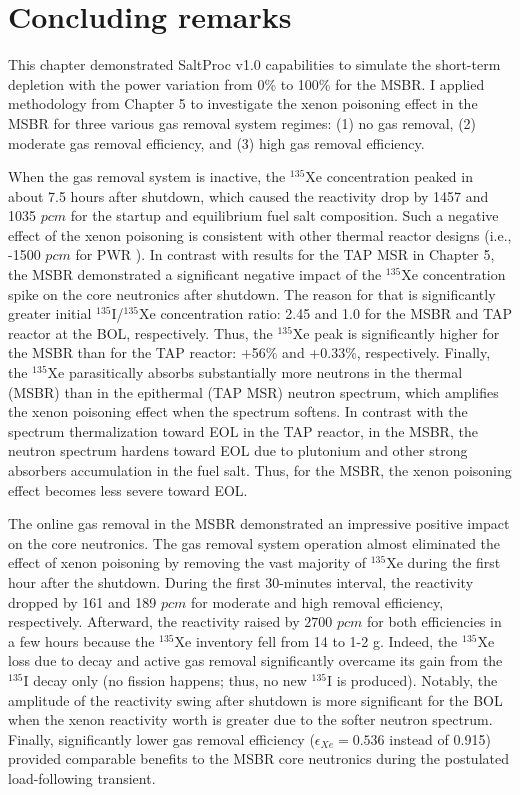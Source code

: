 \section{Concluding remarks}
This chapter demonstrated SaltProc v1.0 capabilities to simulate the 
short-term depletion with the power variation from 0\% to 100\% for the 
\gls{MSBR}. I applied methodology from Chapter 5 to investigate the xenon 
poisoning effect in the \gls{MSBR} for three various gas removal system 
regimes: (1) no gas removal, (2) moderate gas removal efficiency, and (3) high 
gas removal efficiency. 

When the gas removal system is inactive, the $^{135}$Xe concentration peaked 
in about 7.5 hours after shutdown, which caused the reactivity drop by 1457 
and 1035 $pcm$ for the startup and equilibrium fuel salt composition. Such a
negative effect of the xenon poisoning is consistent with other thermal 
reactor designs (i.e., -1500 $pcm$ for \gls{PWR} 
\cite{rykhlevskii_impact_2019}). In contrast with results for the \gls{TAP} 
\gls{MSR} in Chapter 5, the \gls{MSBR} demonstrated a significant negative 
impact of the $^{135}$Xe concentration spike on the core neutronics after 
shutdown. The reason for that is significantly greater initial 
$^{135}$I/$^{135}$Xe concentration ratio: 2.45 and 1.0 for the \gls{MSBR} and 
\gls{TAP} reactor at the \gls{BOL}, respectively. Thus, the $^{135}$Xe peak is 
significantly higher for the \gls{MSBR} than for the \gls{TAP} reactor: +56\% 
and +0.33\%, respectively. Finally, the $^{135}$Xe parasitically absorbs 
substantially more neutrons in the thermal (\gls{MSBR}) than in the epithermal 
(\gls{TAP} \gls{MSR}) neutron spectrum, which amplifies the xenon poisoning 
effect when the spectrum softens. In contrast with the spectrum thermalization 
toward \gls{EOL} in the \gls{TAP} reactor, in the \gls{MSBR}, the neutron 
spectrum hardens toward \gls{EOL} due to plutonium and other strong absorbers 
accumulation in the fuel salt. Thus, for the \gls{MSBR}, the xenon poisoning 
effect becomes less severe toward \gls{EOL}. 

The online gas removal in the \gls{MSBR} demonstrated an impressive positive 
impact on the core neutronics. The gas removal system operation almost 
eliminated the effect of xenon poisoning by removing the vast majority of 
$^{135}$Xe during the first hour after the shutdown. During the first 
30-minutes interval, 
the reactivity dropped by 161 and 189 $pcm$ for moderate and high removal 
efficiency, respectively. Afterward, the reactivity raised by 
$2700$ $pcm$ for both efficiencies in a few hours because the $^{135}$Xe 
inventory fell from 14 to 1-2 g. Indeed, the $^{135}$Xe loss due to decay 
and active gas removal significantly  overcame its gain from the $^{135}$I 
decay only (no fission happens; thus, no new $^{135}$I is produced). Notably, 
the amplitude of the reactivity swing after shutdown is more significant for 
the \gls{BOL} when the xenon reactivity worth is greater due to the softer 
neutron spectrum. Finally, significantly lower gas removal efficiency 
($\epsilon_{Xe}=0.536$ instead of 0.915) provided comparable benefits to the 
\gls{MSBR} core neutronics during the postulated load-following transient.

